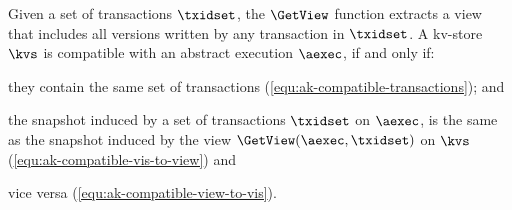 Given a set of transactions \( \txidset \), the  \( \GetView \) function extracts a view 
that includes all versions written by any transaction in \( \txidset \).
A kv-store \( \kvs \) is compatible with an abstract execution \(\aexec \),
if and only if: 
\begin{enumerate*}
\item they contain the same set of transactions (\cref{equ:ak-compatible-transactions}); and 
\item the snapshot induced by a set of transactions \( \txidset \) on \( \aexec \), 
is the same as the snapshot induced by the view \( \GetView(\aexec,\txidset) \) on \( \kvs \) (\cref{equ:ak-compatible-vis-to-view})
and \item vice versa (\cref{equ:ak-compatible-view-to-vis}).
\end{enumerate*}

